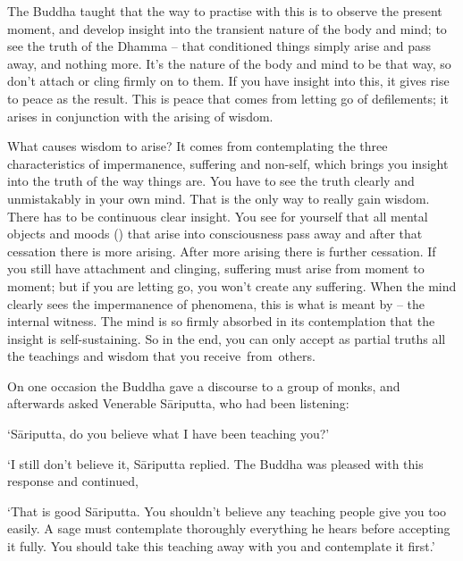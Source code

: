 The Buddha taught that the way to practise with this is to observe the present moment, and develop insight into the transient nature of the body and mind; to see the truth of the Dhamma -- that conditioned things simply arise and pass away, and nothing more. It's the nature of the body and mind to be that way, so don't attach or cling firmly on to them. If you have insight into this, it gives rise to peace as the result. This is peace that comes from letting go of defilements; it arises in conjunction with the arising of wisdom.

What causes wisdom to arise? It comes from contemplating the three characteristics of impermanence, suffering and non-self, which brings you insight into the truth of the way things are. You have to see the truth clearly and unmistakably in your own mind. That is the only way to really gain wisdom. There has to be continuous clear insight. You see for yourself that all mental objects and moods () that arise into consciousness pass away and after that cessation there is more arising. After more arising there is further cessation. If you still have attachment and clinging, suffering must arise from moment to moment; but if you are letting go, you won't create any suffering. When the mind clearly sees the impermanence of phenomena, this is what is meant by  -- the internal witness. The mind is so firmly absorbed in its contemplation that the insight is self-sustaining. So in the end, you can only accept as partial truths all the teachings and wisdom that you \mbox{receive from others.}

On one occasion the Buddha gave a discourse to a group of monks, and afterwards asked Venerable S\=ariputta, who had been listening: 

`S\=ariputta, do you believe what I have been teaching you?'

`I still don't believe it,  S\=ariputta replied. The Buddha was pleased with this response and continued, 

`That is good S\=ariputta. You shouldn't believe any teaching people give you too easily. A sage must contemplate thoroughly everything he hears before accepting it fully. You should take this teaching away with you and contemplate it first.'

